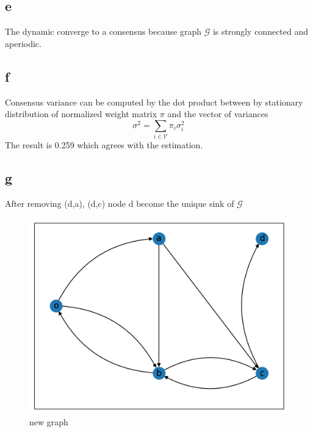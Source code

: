 \documentclass{article}
\begin{document}
\subsection{e}
The dynamic converge to a consensus because graph $\mathcal{G}$ is strongly connected and aperiodic.
\subsection{f}
Consensus variance can be computed by the dot product between by stationary distribution of normalized weight matrix $\pi$ and the vector of variances
$$\sigma^2 = \sum_{i \in \mathcal{V}}\pi_i\sigma_i^2$$
The result is 0.259 which agrees with the estimation.
\subsection{g}
After removing (d,a), (d,c) node d become the unique sink of $\mathcal{G}$
\begin{figure}[!htbp]
    \centering
    \includegraphics[width=\linewidth]{fig/1g}   
    \caption{new graph}
   \label{fig:figure1}
\end{figure}
\end{document}
